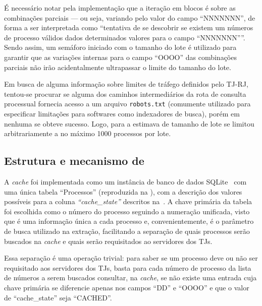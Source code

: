 É necessário notar pela implementação que a iteração em blocos é sobre as
combinações parciais --- ou seja, variando pelo valor do campo ``NNNNNNN'', de
forma a ser interpretada como ``tentativa de se descobrir se existem um números
de processo válidos dados determinados valores para o campo ``NNNNNNN''''.
Sendo assim, um semáforo iniciado com o tamanho do lote é utilizado para
garantir que as variações internas para o campo ``OOOO'' das combinações
parciais não irão acidentalmente ultrapassar o limite do tamanho do lote.

Em busca de alguma informação sobre limites de tráfego definidos pelo TJ-RJ,
tentou-se procurar se alguma dos caminhos intermediários da rota de consulta
processual fornecia acesso a um arquivo \texttt{robots.txt} (comumente
utilizado para especificar limitações para softwares como indexadores de
busca), porém em nenhuma se obteve sucesso. Logo, para a estimava de tamanho de
lote se limitou arbitrariamente a no máximo 1000 processos por lote.

\subsection{Estrutura e mecanismo de }

A \textit{cache} foi implementada como um instância de banco de dados
SQLite~\cite{tool:sqlite} com uma única tabela ``Processos'' (reproduzida na
), com a descrição dos valores possíveis
para a coluna \textit{``cache\_state''} descritos
na~. A chave primária da tabela foi escolhida
como o número do processo seguindo a numeração unificada, visto que é uma
informação única a cada processo e, convenientemente, é o parâmetro de busca
utilizado na extração, facilitando a separação de quais processos serão
buscados na \textit{cache} e quais serão requisitados ao servidores dos TJs.

Essa separação é uma operação trivial: para saber se um processo deve ou não
ser requisitado aos servidores dos TJs, basta para cada número de processo da
lista de números a serem buscados consultar, na \textit{cache}, se não existe
uma entrada cuja chave primária se diferencie apenas nos campos ``DD'' e
``OOOO'' e que o valor de ``cache\_state'' seja ``CACHED''.

